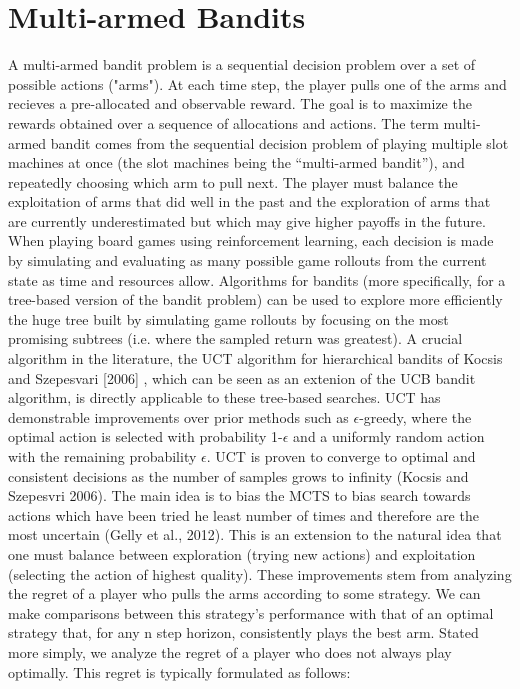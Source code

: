 \documentclass[msc, deptreport, ai, romanprepages]{infthesis}
\begin{document}
\section{Multi-armed Bandits}
A multi-armed bandit problem \cite{robbins1952} is a sequential decision problem over a set of possible actions ("arms"). At each time step, the player pulls one of the arms and recieves a pre-allocated and observable reward. The goal is to maximize the rewards obtained over a sequence of allocations and actions. The term multi-armed bandit comes from the sequential decision problem of playing multiple slot machines at once (the slot machines being the “multi-armed bandit”), and repeatedly choosing which arm to pull next. The player must balance the exploitation of arms that did well in the past and the exploration of arms that are currently underestimated but which may give higher payoffs in the future. 
When playing board games using reinforcement learning, each decision is made by simulating and evaluating as many possible game rollouts from the current state as time and resources allow. Algorithms for bandits (more specifically, for a tree-based version of the bandit problem) can be used to explore more efficiently the huge tree built by simulating game rollouts by focusing on the most promising subtrees (i.e. where the sampled return was greatest). A crucial algorithm in the literature, the UCT algorithm for hierarchical bandits of Kocsis and Szepesvari [2006] \cite{Kocsis2006}, which can be seen as an extenion of the UCB bandit algorithm, is directly applicable to these tree-based searches. UCT has demonstrable improvements over prior methods such as \(\epsilon\)-greedy, where the optimal action is selected with probability 1-\(\epsilon\) and a uniformly random action with the remaining probability \(\epsilon\). UCT is proven to converge to optimal and consistent decisions as the number of samples grows to infinity (Kocsis and Szepesvri 2006). The main idea is to bias the MCTS to bias search towards actions which have been tried he least number of times and therefore are the most uncertain (Gelly et al., 2012). This is an extension to the natural idea that one must balance between exploration (trying new actions) and exploitation (selecting the action of highest quality). These improvements stem from analyzing the regret of a player who pulls the arms according to some strategy. We can make comparisons between this strategy's performance with that of an optimal strategy that, for any n step horizon, consistently plays the best arm. Stated more simply, we analyze the regret of a player who does not always play optimally. This regret is typically formulated as follows:
\end{document}
